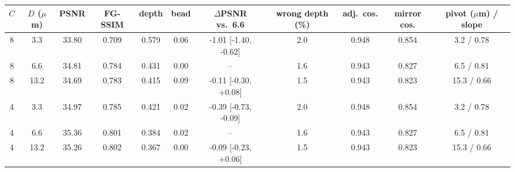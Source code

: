 \begin{tabular}{@{}cc ccc c c ccc c@{}}\toprule
$C$ & $D$ ($\mu$m) & PSNR & FG-SSIM & depth & bead & $\Delta$PSNR vs.\ 6.6 & wrong depth (\%) & adj.\ cos. & mirror cos. & pivot ($\mu$m) / slope\\\midrule
8 & 3.3 & 33.80 & 0.709 & 0.579 & 0.06 & -1.01 [-1.40, -0.62] & 2.0 & 0.948 & 0.854 & 3.2 / 0.78\\
8 & 6.6 & 34.81 & 0.784 & 0.431 & 0.00 & -- & 1.6 & 0.943 & 0.827 & 6.5 / 0.81\\
8 & 13.2 & 34.69 & 0.783 & 0.415 & 0.09 & -0.11 [-0.30, +0.08] & 1.5 & 0.943 & 0.823 & 15.3 / 0.66\\
4 & 3.3 & 34.97 & 0.785 & 0.421 & 0.02 & -0.39 [-0.73, -0.09] & 2.0 & 0.948 & 0.854 & 3.2 / 0.78\\
4 & 6.6 & 35.36 & 0.801 & 0.384 & 0.02 & -- & 1.6 & 0.943 & 0.827 & 6.5 / 0.81\\
4 & 13.2 & 35.26 & 0.802 & 0.367 & 0.00 & -0.09 [-0.23, +0.06] & 1.5 & 0.943 & 0.823 & 15.3 / 0.66\\
\bottomrule\end{tabular}
